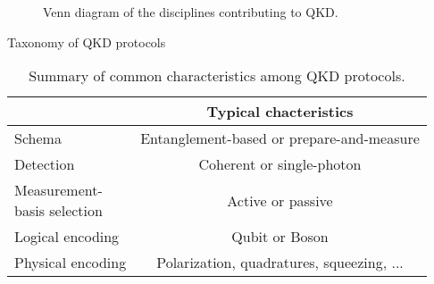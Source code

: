 \documentclass[aspectratio=169,usenames,dvipsnames]{beamer}
\begin{document}
	\begin{frame}
		\begin{figure}
			\caption{Venn diagram of the disciplines contributing to QKD.}
		\end{figure}
	\end{frame}
	
	\begin{frame}{Taxonomy of QKD protocols}
		\begin{table}
			\caption{Summary of common characteristics among QKD protocols.}
			\begin{tabular}{lc}
				\toprule
				& Typical chacteristics \\
				\midrule
				Schema & Entanglement-based or prepare-and-measure \\
				Detection & Coherent or single-photon \\
				\makecell[l]{Measurement-\\basis selection} & Active or passive \\
				Logical encoding & Qubit or Boson \\
				Physical encoding & Polarization, quadratures, squeezing, ... \\
				\bottomrule
			\end{tabular}
		\end{table}
	\end{frame}
	
\end{document}
